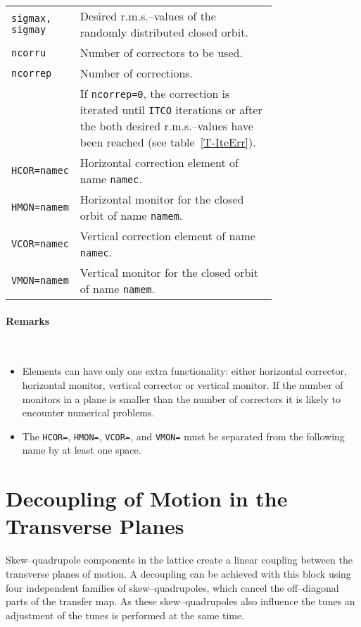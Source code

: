 \bigskip
\begin{longtabu}{@{}lp{0.75\linewidth}}
    \texttt{sigmax, sigmay} & Desired r.m.s.--values of the randomly distributed closed orbit. \\
    \texttt{ncorru}         & Number of correctors to be used. \\
    \texttt{ncorrep}        & Number of corrections. \\
                            & If \texttt{ncorrep=0}, the correction is iterated until \texttt{ITCO} iterations or after the both desired r.m.s.--values have been reached (see table~\ref{T-IteErr}). \\
    \texttt{HCOR=namec}     & Horizontal correction element of name \texttt{namec}. \\
    \texttt{HMON=namem}     & Horizontal monitor for the closed orbit of name \texttt{namem}. \\
    \texttt{VCOR=namec}     & Vertical correction element of name \texttt{namec}. \\
    \texttt{VMON=namem}     & Vertical monitor for the closed orbit of name \texttt{namem}.
\end{longtabu}

\paragraph{Remarks}~

\begin{itemize}
    \item Elements can have only one extra functionality: either horizontal corrector, horizontal monitor, vertical corrector or   vertical monitor. If the number of monitors in a plane is smaller than the number of correctors it is likely to encounter numerical problems.
    \item The \texttt{HCOR=}, \texttt{HMON=}, \texttt{VCOR=}, and \texttt{VMON=} must be separated from the following name by at least one space.
\end{itemize}

\section{Decoupling of Motion in the Transverse Planes} \label{LinDec} 

Skew--quadrupole components in the lattice create a linear coupling between the transverse planes of motion.
A decoupling can be achieved with this block using four independent families of skew--quadrupoles, which cancel the off--diagonal parts of the transfer map.
As these skew--quadrupoles also influence the tunes an adjustment of the tunes is performed at the same time.

